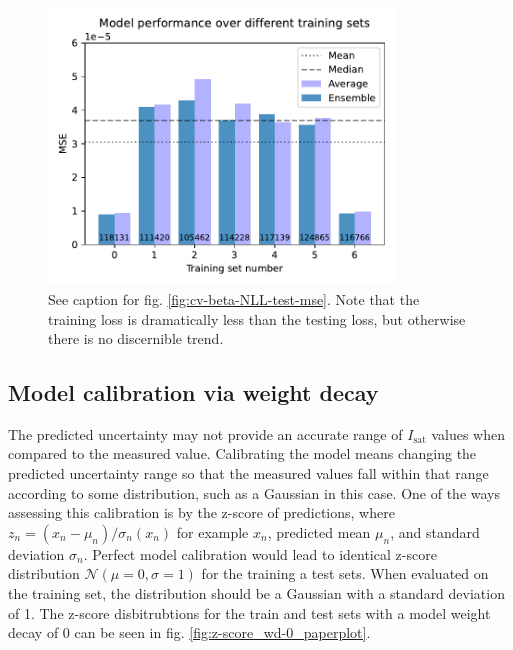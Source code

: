 \begin{figure}
	\centering
	\includegraphics[width=260pt]{figures/cv-beta-NLL-train-mse.pdf}
	\caption[Cross-validation training set error]{\label{fig:cv-beta-NLL-train-mse}See caption for fig. \ref{fig:cv-beta-NLL-test-mse}. Note that the training loss is dramatically less than the testing loss, but otherwise there is no discernible trend.}
\end{figure}

\subsection{Model calibration via weight decay}

The predicted uncertainty may not provide an accurate range of $I_\text{sat}$ values when compared to the measured value. Calibrating the model means changing the predicted uncertainty range so that the measured values fall within that range according to some distribution, such as a Gaussian in this case. One of the ways assessing this calibration is by the z-score of predictions, where $z_n= \left(x_n - \mu_n \right) / \sigma_n(x_n)$ for example $x_n$, predicted mean $\mu_n$, and standard deviation $\sigma_n$. Perfect model calibration would lead to identical z-score distribution $\mathcal{N}(\mu=0, \sigma=1)$ for the training a test sets. When evaluated on the training set, the distribution should be a Gaussian with a standard deviation of 1. The z-score disbitrubtions for the train and test sets with a model weight decay of 0 can be seen in fig. \ref{fig:z-score_wd-0_paperplot}.

